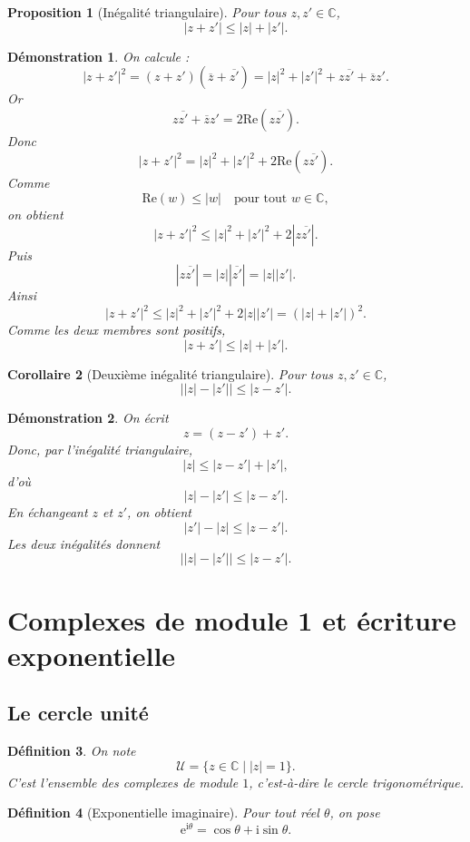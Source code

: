 \documentclass[11pt,a4paper]{article}
\newtheorem{definition}{Définition}[section]
\newtheorem{proposition}[definition]{Proposition}
\newtheorem{corollaire}[definition]{Corollaire}
\newtheorem*{demonstration}{Démonstration}
\newcommand{\C}{\mathbb{C}}
\newcommand{\U}{\mathcal{U}}
\newcommand{\ii}{\mathrm{i}}
\newcommand{\e}{\mathrm{e}}
\newcommand{\Ree}{\mathrm{Re}}
\begin{document}
\begin{proposition}[Inégalité triangulaire]
Pour tous $z,z'\in \C$,
\[
|z+z'|\leq |z|+|z'|.
\]
\end{proposition}

\begin{demonstration}
On calcule :
\[
|z+z'|^2=(z+z')(\overline{z}+\overline{z'})
=|z|^2+|z'|^2+z\overline{z'}+\overline{z}z'.
\]
Or
\[
z\overline{z'}+\overline{z}z'=2\Ree(z\overline{z'}).
\]
Donc
\[
|z+z'|^2=|z|^2+|z'|^2+2\Ree(z\overline{z'}).
\]
Comme
\[
\Ree(w)\leq |w| \quad \text{pour tout } w\in \C,
\]
on obtient
\[
|z+z'|^2\leq |z|^2+|z'|^2+2|z\overline{z'}|.
\]
Puis
\[
|z\overline{z'}|=|z||\overline{z'}|=|z||z'|.
\]
Ainsi
\[
|z+z'|^2\leq |z|^2+|z'|^2+2|z||z'|=(|z|+|z'|)^2.
\]
Comme les deux membres sont positifs,
\[
|z+z'|\leq |z|+|z'|.
\]
\end{demonstration}

\begin{corollaire}[Deuxième inégalité triangulaire]
Pour tous $z,z'\in \C$,
\[
\bigl||z|-|z'|\bigr|\leq |z-z'|.
\]
\end{corollaire}

\begin{demonstration}
On écrit
\[
z=(z-z')+z'.
\]
Donc, par l'inégalité triangulaire,
\[
|z|\leq |z-z'|+|z'|,
\]
d'où
\[
|z|-|z'|\leq |z-z'|.
\]
En échangeant $z$ et $z'$, on obtient
\[
|z'|-|z|\leq |z-z'|.
\]
Les deux inégalités donnent
\[
\bigl||z|-|z'|\bigr|\leq |z-z'|.
\]
\end{demonstration}

\section{Complexes de module 1 et écriture exponentielle}

\subsection{Le cercle unité}

\begin{definition}
On note
\[
\U=\{z\in \C \mid |z|=1\}.
\]
C'est l'ensemble des complexes de module $1$, c'est-à-dire le cercle trigonométrique.
\end{definition}

\begin{definition}[Exponentielle imaginaire]
Pour tout réel $\theta$, on pose
\[
\e^{\ii\theta}=\cos\theta+\ii\sin\theta.
\]
\end{definition}
\end{document}

